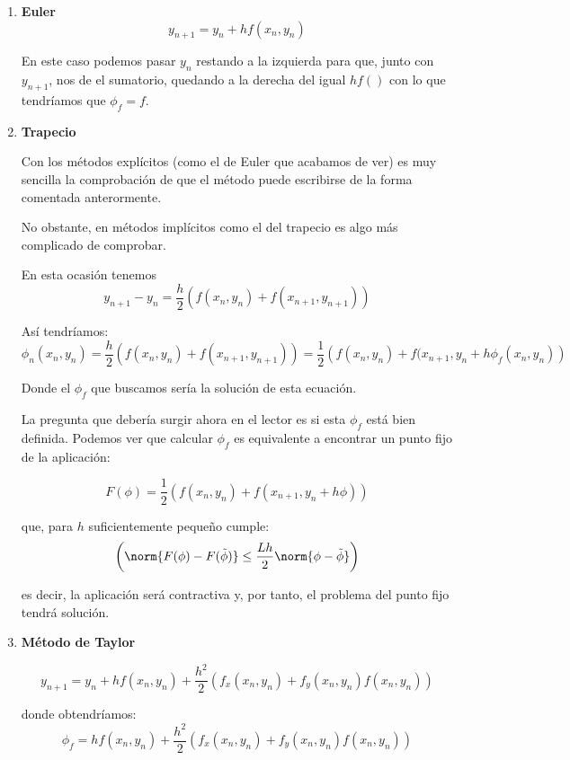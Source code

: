 \documentclass{apuntes}
\begin{document}
\begin{example}
\begin{enumerate}
\item \textbf{Euler}
\[y_{n+1} = y_n+hf(x_n,y_n)\]

En este caso podemos pasar $y_n$ restando a la izquierda para que, junto con $y_{n+1}$, nos de el sumatorio, quedando a la derecha del igual $hf()$ con lo que tendríamos que $\phi_f=f$.

\item \textbf{Trapecio}

Con los métodos explícitos (como el de Euler que acabamos de ver) es muy sencilla la comprobación de que el método puede escribirse de la forma comentada anterormente.

No obstante, en métodos implícitos como el del trapecio es algo más complicado de comprobar.

En esta ocasión tenemos
\[y_{n+1}-y_n = \frac{h}{2}\left(f(x_n,y_n)+f(x_{n+1},y_{n+1}) \right)\]

Así tendríamos:
\[\phi_n (x_n,y_n) = \frac{h}{2}\left(f(x_n,y_n)+f(x_{n+1},y_{n+1}) \right) = \frac{1}{2}\left( f(x_n,y_n) + f(x_{n+1},y_n+h\phi_f(x_n,y_n)\right)\]

Donde el $\phi_f$ que buscamos sería la solución de esta ecuación.

La pregunta que debería surgir ahora en el lector es si esta $\phi_f$ está bien definida. Podemos ver que calcular $\phi_f$ es equivalente a encontrar un punto fijo de la aplicación:

\[F(\phi) = \frac{1}{2} \left(f(x_n,y_n)+f(x_{n+1},y_n+h\phi)\right)\]

que, para $h$ suficientemente pequeño cumple:
\begin{equation}
	\label{eq:F_contractiva}
	\left(\norm{F(\phi)-F(\tilde{\phi})} \leq \frac{Lh}{2}\norm{\phi- \tilde{\phi}}\right)
\end{equation}

es decir, la aplicación será contractiva y, por tanto, el problema del punto fijo tendrá solución.

\item \textbf{Método de Taylor}

\[y_{n+1}=y_n+hf(x_n,y_n)+\frac{h^2}{2}\left(f_x(x_n,y_n)+f_y(x_n,y_n)f(x_n,y_n)\right)\]

donde obtendríamos:
\[\phi_f = hf(x_n,y_n)+\frac{h^2}{2}\left(f_x(x_n,y_n)+f_y(x_n,y_n)f(x_n,y_n)\right)\]
\end{enumerate}
\end{example}
\end{document}
